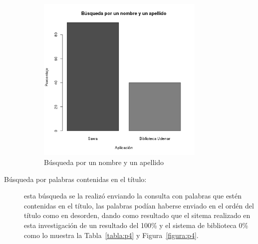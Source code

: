 \begin{description}
 \begin{figure}[!ht]
\begin{center}
\includegraphics[width=8cm]{pictures/p3.png}
\end{center}
\caption{Búsqueda por un nombre y un apellido} \label{figura:p3}
\end{figure}
 
 \newpage
 \item [Búsqueda por palabras contenidas en el título:] esta búsqueda se la realizó enviando la consulta
 con palabras que estén contenidas en el título, las palabras podían haberse enviado en el ordén del
 título como en desorden, dando como resultado que el sitema realizado
 en esta investigación de un resultado del 100\% y el sistema de biblioteca 0\% como lo muestra la Tabla~\ref{tabla:p4} y Figura~\ref{figura:p4}.
 
    \begin{center}
\begin{table}[!ht]
\caption{Búsqueda por palabras contenidas en el título}  \label{tabla:p4}
\end{table}
\end{center}
 

\end{description}
